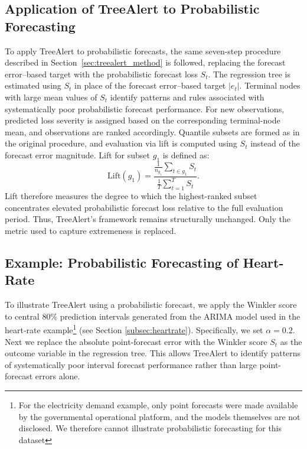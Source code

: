 \documentclass[12pt]{article}
\begin{document}
\subsection{Application of TreeAlert to Probabilistic Forecasting}

To apply TreeAlert to probabilistic forecasts, the same seven-step procedure described in Section~\ref{sec:treealert_method} is followed, replacing the forecast error–based target with the probabilistic forecast loss $S_t$. %
The regression tree is estimated using $S_t$ in place of the forecast error–based target $|e_t|$. Terminal nodes with large mean values of $S_t$ identify patterns and rules associated with systematically poor probabilistic forecast performance. For new observations, predicted loss severity is assigned based on the corresponding terminal-node mean, and observations are ranked accordingly. Quantile subsets are formed as in the original procedure, and evaluation via lift is computed using $S_t$ instead of the forecast error magnitude. Lift for subset $g_{1}$ is defined as: 
\begin{equation}
\text{Lift}(g_{1}) =
\frac{
\displaystyle \frac{1}{n_{g_1}} \sum_{t \in g_{1}} S_t
}{
\displaystyle \frac{1}{T} \sum_{t=1}^{T} S_t
}.
\end{equation}
Lift therefore measures the degree to which the highest-ranked subset concentrates elevated probabilistic forecast loss relative to the full evaluation period. Thus, TreeAlert's framework remains structurally unchanged. Only the metric used to capture extremeness is replaced.

\subsection{Example: Probabilistic Forecasting of Heart-Rate}

To illustrate TreeAlert using a probabilistic forecast, we apply the Winkler score to central 80\% prediction intervals generated from the ARIMA model used in the heart‑rate example\footnote{For the electricity demand example, only point forecasts were made available %
by the governmental operational platform, and the models themselves are not disclosed. We therefore cannot illustrate probabilistic forecasting for this dataset}%
 (see Section \ref{subsec:heartrate}). Specifically, we set %
$\alpha=0.2$. Next we replace the absolute point‑forecast error with the Winkler score $S_t$ as the outcome variable in the regression tree. This allows TreeAlert to identify patterns of systematically poor interval forecast performance rather than large point-forecast errors alone. 
\end{document}
